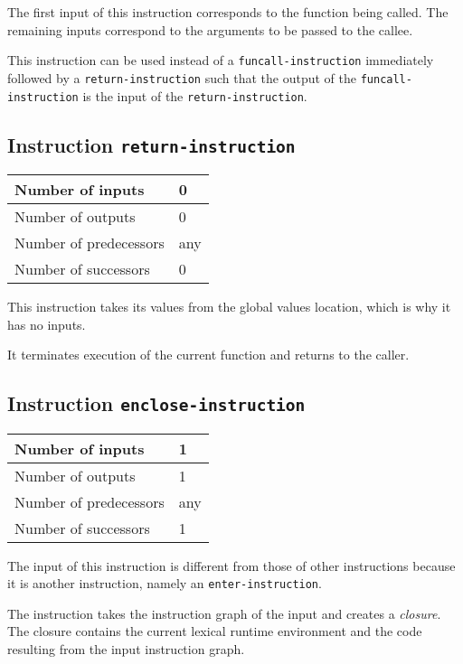 The first input of this instruction corresponds to the function being
called.  The remaining inputs correspond to the arguments to be passed
to the callee.

This instruction can be used instead of a \texttt{funcall-instruction}
immediately followed by a \texttt{return-instruction} such that the
output of the \texttt{funcall-instruction} is the input of the
\texttt{return-instruction}.

\subsection{Instruction \texttt{return-instruction}}
\label{hir-instruction-return}

\begin{tabular}{|l|l|}
\hline
Number of inputs & 0\\
\hline
Number of outputs & 0\\
\hline
Number of predecessors & any\\
\hline
Number of successors & 0\\
\hline
\end{tabular}

This instruction takes its values from the global values location,
which is why it has no inputs.

It terminates execution of the current function and returns to the
caller. 

\subsection{Instruction \texttt{enclose-instruction}}
\label{hir-instruction-enclose}

\begin{tabular}{|l|l|}
\hline
Number of inputs & 1\\
\hline
Number of outputs & 1\\
\hline
Number of predecessors & any\\
\hline
Number of successors & 1\\
\hline
\end{tabular}

The input of this instruction is different from those of other
instructions because it is another instruction, namely an
\texttt{enter-instruction}.

The instruction takes the instruction graph of the input and creates a
\emph{closure}.  The closure contains the current lexical runtime
environment and the code resulting from the input instruction graph.

